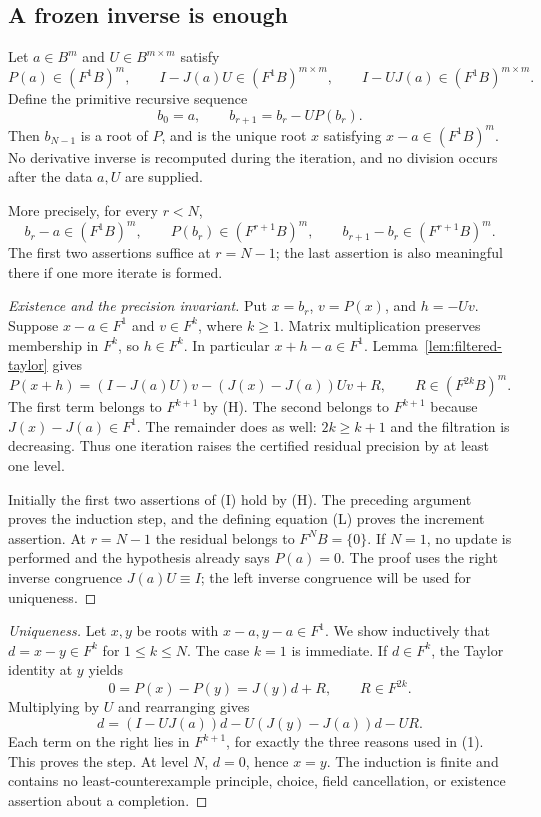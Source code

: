 \subsection{A frozen inverse is enough}

\begin{theorem}
\label{thm:filtered-lifting}
Let $a\in B^m$ and $U\in B^{m\times m}$ satisfy
\[
 P(a)\in(F^1B)^m,\qquad
 I-J(a)U\in(F^1B)^{m\times m},\qquad
 I-UJ(a)\in(F^1B)^{m\times m}.                 \tag{H}
\]
Define the primitive recursive sequence
\[
 b_0=a,\qquad b_{r+1}=b_r-U P(b_r).            \tag{L}
\]
Then $b_{N-1}$ is a root of $P$, and is the unique root $x$ satisfying
$x-a\in(F^1B)^m$.  No derivative inverse is recomputed during the
iteration, and no division occurs after the data $a,U$ are supplied.

More precisely, for every $r<N$,
\[
 b_r-a\in(F^1B)^m,\qquad
 P(b_r)\in(F^{r+1}B)^m,\qquad
 b_{r+1}-b_r\in(F^{r+1}B)^m.                 \tag{I}
\]
The first two assertions suffice at $r=N-1$; the last assertion is also
meaningful there if one more iterate is formed.
\end{theorem}

\begin{proof}[Existence and the precision invariant]
Put $x=b_r$, $v=P(x)$, and $h=-Uv$.  Suppose $x-a\in F^1$ and
$v\in F^k$, where $k\ge1$.  Matrix multiplication preserves membership
in $F^k$, so $h\in F^k$.  In particular $x+h-a\in F^1$.
Lemma~\ref{lem:filtered-taylor} gives
\[
 P(x+h)=(I-J(a)U)v-(J(x)-J(a))Uv+R,
 \qquad R\in(F^{2k}B)^m.                    \tag{1}
\]
The first term belongs to $F^{k+1}$ by (H).  The second belongs to
$F^{k+1}$ because $J(x)-J(a)\in F^1$.  The remainder does as well:
$2k\ge k+1$ and the filtration is decreasing.  Thus one iteration
raises the certified residual precision by at least one level.

Initially the first two assertions of (I) hold by (H).  The preceding
argument proves the induction step, and the defining equation (L) proves
the increment assertion.  At $r=N-1$ the residual belongs to $F^NB=\{0\}$.
If $N=1$, no update is performed and the hypothesis already says $P(a)=0$.
The proof uses the right inverse congruence $J(a)U\equiv I$; the left
inverse congruence will be used for uniqueness.
\end{proof}

\begin{proof}[Uniqueness]
Let $x,y$ be roots with $x-a,y-a\in F^1$.  We show inductively that
$d=x-y\in F^k$ for $1\le k\le N$.  The case $k=1$ is immediate.
If $d\in F^k$, the Taylor identity at $y$ yields
\[
 0=P(x)-P(y)=J(y)d+R,\qquad R\in F^{2k}.
\]
Multiplying by $U$ and rearranging gives
\[
 d=(I-UJ(a))d-U(J(y)-J(a))d-UR.              \tag{2}
\]
Each term on the right lies in $F^{k+1}$, for exactly the three reasons
used in (1).  This proves the step.  At level $N$, $d=0$, hence $x=y$.
The induction is finite and contains no least-counterexample principle,
choice, field cancellation, or existence assertion about a completion.
\end{proof}

